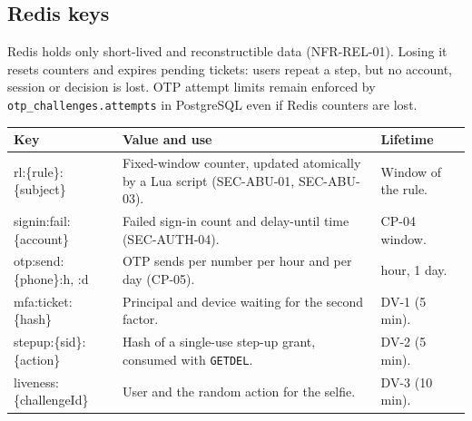 \documentclass[11pt,a4paper]{article}
\newenvironment{dtable}[1]{\small\begin{longtable}{#1}}{\end{longtable}}
\begin{document}
\subsection{Redis keys}
\label{sec:redis}
Redis holds only short-lived and reconstructible data (NFR-REL-01). Losing it resets counters and expires pending tickets: users repeat a step, but no account, session or decision is lost. OTP attempt limits remain enforced by \texttt{otp\_challenges.attempts} in PostgreSQL even if Redis counters are lost.
\begin{dtable}{@{}>{\ttfamily\raggedright\arraybackslash}p{4.8cm}>{\raggedright\arraybackslash}p{6.0cm}>{\raggedright\arraybackslash}p{4.4cm}@{}}
\toprule
\textnormal{\textbf{Key}} & \textbf{Value and use} & \textbf{Lifetime} \\ \midrule \endhead
rl:\{rule\}:\{subject\} & Fixed-window counter, updated atomically by a Lua script (SEC-ABU-01, SEC-ABU-03). & Window of the rule. \\
signin:fail:\{account\} & Failed sign-in count and delay-until time (SEC-AUTH-04). & CP-04 window. \\
otp:send:\{phone\}:h, :d & OTP sends per number per hour and per day (CP-05). & 1 hour, 1 day. \\
mfa:ticket:\{hash\} & Principal and device waiting for the second factor. & DV-1 (5 min). \\
stepup:\{sid\}:\{action\} & Hash of a single-use step-up grant, consumed with \texttt{GETDEL}. & DV-2 (5 min). \\
liveness:\{challengeId\} & User and the random action for the selfie. & DV-3 (10 min). \\
\bottomrule
\end{dtable}
\end{document}
